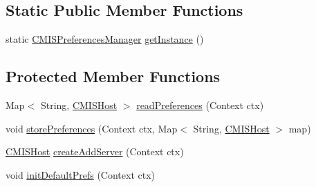 \subsection*{Static Public Member Functions}
\begin{DoxyCompactItemize}
\item 
static \hyperlink{classcom_1_1zia_1_1freshdocs_1_1preference_1_1_c_m_i_s_preferences_manager}{C\-M\-I\-S\-Preferences\-Manager} \hyperlink{classcom_1_1zia_1_1freshdocs_1_1preference_1_1_c_m_i_s_preferences_manager_acf8136c1bc0186025abf6fb5fcc3c97e}{get\-Instance} ()
\end{DoxyCompactItemize}
\subsection*{Protected Member Functions}
\begin{DoxyCompactItemize}
\item 
Map$<$ String, \hyperlink{classcom_1_1zia_1_1freshdocs_1_1preference_1_1_c_m_i_s_host}{C\-M\-I\-S\-Host} $>$ \hyperlink{classcom_1_1zia_1_1freshdocs_1_1preference_1_1_c_m_i_s_preferences_manager_a55fff520122873197b4af7567decf7b0}{read\-Preferences} (Context ctx)
\item 
void \hyperlink{classcom_1_1zia_1_1freshdocs_1_1preference_1_1_c_m_i_s_preferences_manager_a9ccdb4e5c52a2b206aee063886c39737}{store\-Preferences} (Context ctx, Map$<$ String, \hyperlink{classcom_1_1zia_1_1freshdocs_1_1preference_1_1_c_m_i_s_host}{C\-M\-I\-S\-Host} $>$ map)
\item 
\hyperlink{classcom_1_1zia_1_1freshdocs_1_1preference_1_1_c_m_i_s_host}{C\-M\-I\-S\-Host} \hyperlink{classcom_1_1zia_1_1freshdocs_1_1preference_1_1_c_m_i_s_preferences_manager_a92db9239fe59c76b09ade7224c49aaa1}{create\-Add\-Server} (Context ctx)
\item 
void \hyperlink{classcom_1_1zia_1_1freshdocs_1_1preference_1_1_c_m_i_s_preferences_manager_ad5da0085071e2c6c49b4df598ff49b24}{init\-Default\-Prefs} (Context ctx)
\end{DoxyCompactItemize}


